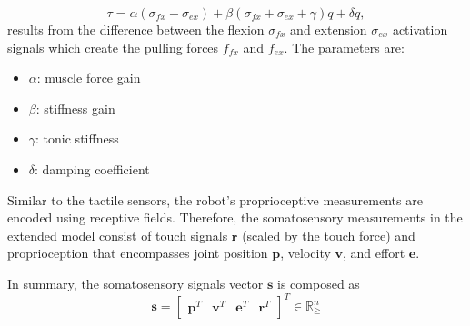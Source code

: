 \begin{equation}\label{eq:antagonistic_torque}
	\tau = \alpha \left(\sigma_{fx} - \sigma_{ex}\right)  + \beta \left(\sigma_{fx} + \sigma_{ex} + \gamma \right) q + \delta \dot{q},
\end{equation}
results from the difference between the flexion $ \sigma_{fx} $ and  extension $\sigma_{ex}$ activation signals which create the pulling forces $ f_{fx}$ and $f_{ex} $. The parameters are:
\begin{itemize}
	\item $\alpha$: muscle force gain
	\item $\beta$: stiffness gain
	\item $\gamma$: tonic stiffness	
	\item $\delta$: damping coefficient
\end{itemize}

Similar to the tactile sensors, the robot's proprioceptive measurements are encoded using receptive fields. Therefore, the somatosensory measurements in the extended model consist of touch signals $\bm{r}$ (scaled by the touch force) and proprioception that encompasses joint position $\bm{p}$, velocity $\bm{v}$, and effort $\bm{e}$.

In summary, the somatosensory signals vector $\bm{s}$ is composed as 
\begin{equation}
	\bm{s} = \begin{bmatrix}
		\bm{p}^T & \bm{v}^T & \bm{e}^T & \bm{r}^T
	\end{bmatrix}^T \in \mathbb{R}^n_{\geq}
\end{equation}

